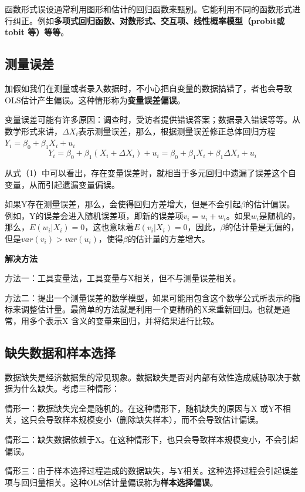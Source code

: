 \documentclass[cn,12pt,math=newtx,citestyle=gb7714-2015,bibstyle=gb7714-2015]{elegantbook}
\begin{document}
函数形式误设通常利用图形和估计的回归函数来甄别。它能利用不同的函数形式进行纠正。例如\textbf{多项式回归函数、对数形式、交互项、线性概率模型（probit或tobit 等）等等}。

\subsection{测量误差}
加假如我们在测量或者录入数据时，不小心把自变量的数据搞错了，者也会导致OLS估计产生偏误。这种情形称为\textbf{变量误差偏误}。

变量误差可能有许多原因：调查时，受访者提供错误答案；数据录入错误等等。从数学形式来讲，$\Delta{X}_i$表示测量误差，那么，根据测量误差修正总体回归方程$Y_i=\beta_0+\beta_1X_i+u_i$
\begin{equation}
	Y_i=\beta_0+\beta_1(X_i+\Delta{X}_i)+u_i=\beta_0+\beta_1X_i+\beta_1\Delta{X}_i+u_i
\end{equation}

从式（1）中可以看出，存在变量误差时，就相当于多元回归中遗漏了误差这个自变量，从而引起遗漏变量偏误。

如果Y存在测量误差，那么，会使得回归方差增大，但是不会引起$\beta$的估计偏误。例如，Y的误差会进入随机误差项，即新的误差项$v_i=u_i+w_i$。如果$w_i$是随机的，那么，$E(w_i|X_i)=0$，这也意味着$E(v_i|X_i)=0$，因此，$\beta$的估计量是无偏的，但是$var(v_i)>var(u_i)$，使得$\beta$的估计量的方差增大。

\textbf{解决方法}

方法一：工具变量法，工具变量与X相关，但不与测量误差相关。

方法二：提出一个测量误差的数学模型，如果可能用包含这个数学公式所表示的指标来调整估计量。最简单的方法就是利用一个更精确的X来重新回归。也就是通常，用多个表示X 含义的变量来回归，并将结果进行比较。

\subsection{缺失数据和样本选择}
数据缺失是经济数据集的常见现象。数据缺失是否对内部有效性造成威胁取决于数据为什么缺失。考虑三种情形：

情形一：数据缺失完全是随机的。在这种情形下，随机缺失的原因与X 或Y不相关，这只会导致样本规模变小（删除缺失样本），而不会导致估计偏误。

情形二：缺失数据依赖于X。在这种情形下，也只会导致样本规模变小，不会引起偏误。

情形三：由于样本选择过程造成的数据缺失，与Y相关。这种选择过程会引起误差项与回归量相关。这种OLS估计量偏误称为\textbf{样本选择偏误}。
\end{document}
